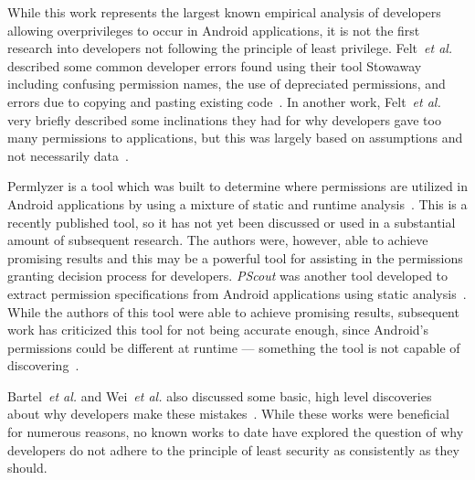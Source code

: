 While this work represents the largest known empirical analysis of developers allowing overprivileges to occur in Android applications, it is not the first research into developers not following the principle of least privilege. Felt~\emph{et al.} described some common developer errors found using their tool Stowaway including confusing permission names, the use of depreciated permissions, and errors due to copying and pasting existing code~\cite{Felt:2011:APD:2046707.2046779}. In another work, Felt~\emph{et al.} very briefly described some inclinations they had for why developers gave too many permissions to applications, but this was largely based on assumptions and not necessarily data~\cite{Felt:2011:EAP:2002168.2002175}.



Permlyzer is a tool which was built to determine where permissions are utilized in Android applications by using a mixture of static and runtime analysis~\cite{6698893}. This is a recently published tool, so it has not yet been discussed or used in a substantial amount of subsequent research. The authors were, however, able to achieve promising results and this may be a powerful tool for assisting in the permissions granting decision process for developers. \emph{PScout} was another tool developed to extract permission specifications from Android applications using static analysis~\cite{Au:2012:PAA:2382196.2382222}. While the authors of this tool were able to achieve promising results, subsequent work has criticized this tool for not being accurate enough, since Android's permissions could be different at runtime --- something the tool is not capable of discovering~\cite{zhang2013vetting}.

Bartel~\emph{et al.} and Wei~\emph{et al.} also discussed some basic, high level discoveries about why developers make these mistakes~\cite{Bartel:2012:ASP:2351676.2351722,Wei:2012:PEA:2420950.2420956}. While these works were beneficial for numerous reasons, no known works to date have explored the question of why developers do not adhere to the principle of least security as consistently as they should.
